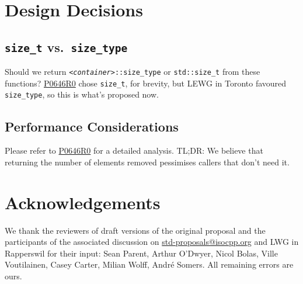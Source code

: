 \documentclass[11pt]{article}
\newcommand{\wgpaper}[1]{\href{https://wg21.link/#1}{#1}}
\newcommand{\cst}{\texttt{\textit{<container>}::size\_type}}
\begin{document}
\section{Design Decisions}

\subsection{\texttt{size\_t} vs.\ \texttt{size\_type}}

Should we return \cst{} or \texttt{std::size\_t} from these functions?
\wgpaper{P0646R0} chose \texttt{size\_t}, for brevity, but LEWG in
Toronto favoured \texttt{size\_type}, so this is what's proposed now.

\subsection{Performance Considerations}

Please refer to \wgpaper{P0646R0} for a detailed analysis. TL;DR: We
believe that returning the number of elements removed pessimises
callers that don't need it.

\section{Acknowledgements}

We thank the reviewers of draft versions of the original proposal and
the participants of the associated discussion on
\url{std-proposals@isocpp.org} and LWG in Rapperswil for their input:
Sean Parent, Arthur O'Dwyer, Nicol Bolas, Ville Voutilainen, Casey
Carter, Milian Wolff, Andr\'e Somers. All remaining errors are ours.
\end{document}
